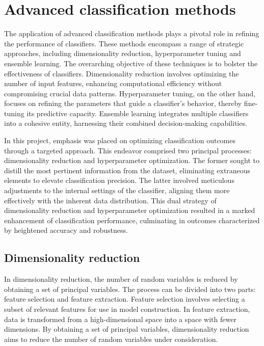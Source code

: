 \documentclass[conference,onecolumn]{IEEEtran}
\begin{document}



\section{Advanced classification methods}
    The application of advanced classification methods plays a pivotal role in refining the performance of classifiers. These methods encompass a range of strategic approaches, including dimensionality reduction, hyperparameter tuning and ensemble learning. The overarching objective of these techniques is to bolster the effectiveness of classifiers\cite{lu2007survey}. Dimensionality reduction involves optimizing the number of input features, enhancing computational efficiency without compromising crucial data patterns\cite{hinton2006reducing}. Hyperparameter tuning, on the other hand, focuses on refining the parameters that guide a classifier's behavior, thereby fine-tuning its predictive capacity\cite{bergstra2012random}. Ensemble learning integrates multiple classifiers into a cohesive entity, harnessing their combined decision-making capabilities\cite{lu2007survey}.

    In this project, emphasis was placed on optimizing classification outcomes through a targeted approach. This endeavor comprised two principal processes: dimensionality reduction and hyperparameter optimization. The former sought to distill the most pertinent information from the dataset, eliminating extraneous elements to elevate classification precision. The latter involved meticulous adjustments to the internal settings of the classifier, aligning them more effectively with the inherent data distribution. This dual strategy of dimensionality reduction and hyperparameter optimization resulted in a marked enhancement of classification performance, culminating in outcomes characterized by heightened accuracy and robustness.
    \subsection{Dimensionality reduction}
        In dimensionality reduction, the number of random variables is reduced by obtaining a set of principal variables\cite{hinton2006reducing}. The process can be divided into two parts: feature selection and feature extraction. Feature selection involves selecting a subset of relevant features for use in model construction\cite{guyon2003introduction}. In feature extraction, data is transformed from a high-dimensional space into a space with fewer dimensions\cite{lecun1998gradient}. By obtaining a set of principal variables, dimensionality reduction aims to reduce the number of random variables under consideration.
        
\end{document}
